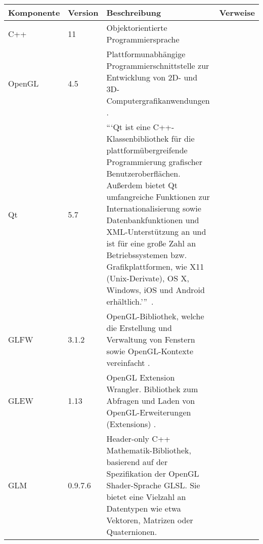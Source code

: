 \begin{tabular}{llp{10cm}l}
    \toprule
    \textbf{Komponente} & \textbf{Version} & \textbf{Beschreibung} & \textbf{Verweise} \\
    \midrule
    C++        & 11      & Objektorientierte Programmiersprache
                           &\protect\footnotemark\\

    OpenGL     & 4.5     & Plattformunabhängige Programmierschnittstelle zur
                           Entwicklung von 2D- und 3D-Computergrafikanwendungen
                           \parencite{wikipedia_the_free_encyclopedia_opengl_2015}.
                           &\protect\footnotemark\\

    Qt        & 5.7      & ```Qt ist eine C++-Klassenbibliothek für die
                           plattformübergreifende Programmierung grafischer
                           Benutzeroberflächen.  Außerdem bietet Qt
                           umfangreiche Funktionen zur Internationalisierung
                           sowie Datenbankfunktionen und XML-Unterstützung an
                           und ist für eine große Zahl an Betriebssystemen bzw.
                           Grafikplattformen, wie X11 (Unix-Derivate), OS X,
                           Windows, iOS und Android
                           erhältlich.'''~\parencite{wikipedia_foundation_qt_2016}.
                           &\protect\footnotemark\\

    GLFW       & 3.1.2   & OpenGL-Bibliothek, welche die Erstellung und
                           Verwaltung von Fenstern sowie OpenGL-Kontexte
                           vereinfacht
                           \parencite{wikipedia_the_free_encyclopedia_glfw_2015}.
                           &\protect\footnotemark\\

    GLEW       & 1.13    & OpenGL Extension Wrangler. Bibliothek zum Abfragen
                           und Laden von OpenGL-Erweiterungen (Extensions)
                           \parencite{wikipedia_the_free_encyclopedia_opengl_2015-1}.
                           &\protect\footnotemark\\

    GLM        & 0.9.7.6 & Header-only C++ Mathematik-Bibliothek, basierend auf
                           der Spezifikation der OpenGL Shader-Sprache GLSL.
                           Sie bietet eine Vielzahl an Datentypen wie etwa
                           Vektoren, Matrizen oder Quaternionen.
                           &\protect\footnotemark\\


\end{tabular}
